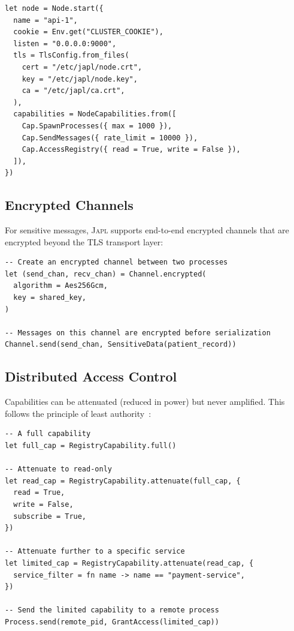 \documentclass[11pt,a4paper]{article}
\newcommand{\japl}{\textsc{Japl}}
\begin{document}
\begin{lstlisting}
let node = Node.start({
  name = "api-1",
  cookie = Env.get("CLUSTER_COOKIE"),
  listen = "0.0.0.0:9000",
  tls = TlsConfig.from_files(
    cert = "/etc/japl/node.crt",
    key = "/etc/japl/node.key",
    ca = "/etc/japl/ca.crt",
  ),
  capabilities = NodeCapabilities.from([
    Cap.SpawnProcesses({ max = 1000 }),
    Cap.SendMessages({ rate_limit = 10000 }),
    Cap.AccessRegistry({ read = True, write = False }),
  ]),
})
\end{lstlisting}

\subsection{Encrypted Channels}

For sensitive messages, \japl{} supports end-to-end encrypted channels
that are encrypted beyond the TLS transport layer:

\begin{lstlisting}
-- Create an encrypted channel between two processes
let (send_chan, recv_chan) = Channel.encrypted(
  algorithm = Aes256Gcm,
  key = shared_key,
)

-- Messages on this channel are encrypted before serialization
Channel.send(send_chan, SensitiveData(patient_record))
\end{lstlisting}

\subsection{Distributed Access Control}

Capabilities can be attenuated (reduced in power) but never amplified.
This follows the principle of least authority~\citep{miller2006robust}:

\begin{lstlisting}
-- A full capability
let full_cap = RegistryCapability.full()

-- Attenuate to read-only
let read_cap = RegistryCapability.attenuate(full_cap, {
  read = True,
  write = False,
  subscribe = True,
})

-- Attenuate further to a specific service
let limited_cap = RegistryCapability.attenuate(read_cap, {
  service_filter = fn name -> name == "payment-service",
})

-- Send the limited capability to a remote process
Process.send(remote_pid, GrantAccess(limited_cap))
\end{lstlisting}
\end{document}
